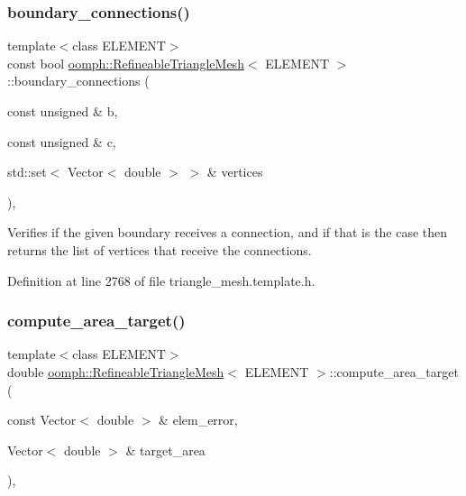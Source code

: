 \subsubsection{\texorpdfstring{boundary\+\_\+connections()}{boundary\_connections()}}
{\footnotesize\ttfamily template$<$class E\+L\+E\+M\+E\+NT$>$ \\
const bool \hyperlink{classoomph_1_1RefineableTriangleMesh}{oomph\+::\+Refineable\+Triangle\+Mesh}$<$ E\+L\+E\+M\+E\+NT $>$\+::boundary\+\_\+connections (\begin{DoxyParamCaption}\item[{const unsigned \&}]{b,  }\item[{const unsigned \&}]{c,  }\item[{std\+::set$<$ Vector$<$ double $>$ $>$ \&}]{vertices }\end{DoxyParamCaption})\hspace{0.3cm}{\ttfamily [inline]}, {\ttfamily [protected]}}



Verifies if the given boundary receives a connection, and if that is the case then returns the list of vertices that receive the connections. 



Definition at line 2768 of file triangle\+\_\+mesh.\+template.\+h.

\mbox{\label{classoomph_1_1RefineableTriangleMesh_a0e2797cd90b0f9afabac4ec28576de05}} 
\subsubsection{\texorpdfstring{compute\+\_\+area\+\_\+target()}{compute\_area\_target()}}
{\footnotesize\ttfamily template$<$class E\+L\+E\+M\+E\+NT$>$ \\
double \hyperlink{classoomph_1_1RefineableTriangleMesh}{oomph\+::\+Refineable\+Triangle\+Mesh}$<$ E\+L\+E\+M\+E\+NT $>$\+::compute\+\_\+area\+\_\+target (\begin{DoxyParamCaption}\item[{const Vector$<$ double $>$ \&}]{elem\+\_\+error,  }\item[{Vector$<$ double $>$ \&}]{target\+\_\+area }\end{DoxyParamCaption})\hspace{0.3cm}{\ttfamily [inline]}, {\ttfamily [protected]}}



